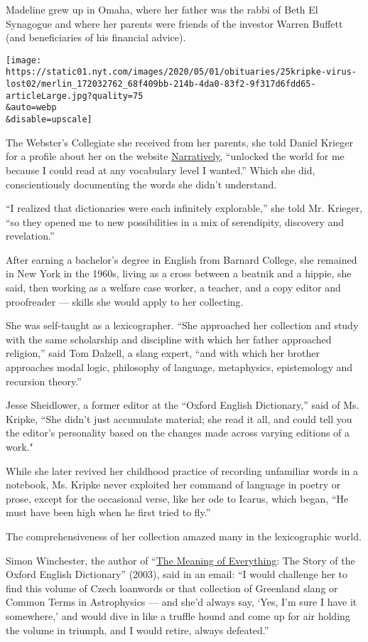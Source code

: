 Madeline grew up in Omaha, where her father was the rabbi of Beth El
Synagogue and where her parents were friends of the investor Warren
Buffett (and beneficiaries of his financial advice).

\texttt{[image: https://static01.nyt.com/images/2020/05/01/obituaries/25kripke-virus-lost02/merlin\_172032762\_68f409bb-214b-4da0-83f2-9f317d6fdd65-articleLarge.jpg?quality=75\\\&auto=webp\\\&disable=upscale]}

The Webster's Collegiate she received from her parents, she told Daniel
Krieger for a profile about her on the website
\href{https://narratively.com/the-dame-of-dictionaries/}{Narratively,}
``unlocked the world for me because I could read at any vocabulary level
I wanted.'' Which she did, conscientiously documenting the words she
didn't understand.

``I realized that dictionaries were each infinitely explorable,'' she
told Mr. Krieger, ``so they opened me to new possibilities in a mix of
serendipity, discovery and revelation.''

After earning a bachelor's degree in English from Barnard College, she
remained in New York in the 1960s, living as a cross between a beatnik
and a hippie, she said, then working as a welfare case worker, a
teacher, and a copy editor and proofreader --- skills she would apply to
her collecting.

She was self-taught as a lexicographer. ``She approached her collection
and study with the same scholarship and discipline with which her father
approached religion,'' said Tom Dalzell, a slang expert, ``and with
which her brother approaches modal logic, philosophy of language,
metaphysics, epistemology and recursion theory.''

Jesse Sheidlower, a former editor at the ``Oxford English Dictionary,''
said of Ms. Kripke, ``She didn't just accumulate material; she read it
all, and could tell you the editor's personality based on the changes
made across varying editions of a work."

While she later revived her childhood practice of recording unfamiliar
words in a notebook, Ms. Kripke never exploited her command of language
in poetry or prose, except for the occasional verse, like her ode to
Icarus, which began, ``He must have been high when he first tried to
fly.''

The comprehensiveness of her collection amazed many in the lexicographic
world.

Simon Winchester, the author of
``\href{https://www.nytimes.com/2003/10/12/books/you-could-look-it-up.html}{The
Meaning of Everything}: The Story of the Oxford English Dictionary''
(2003), said in an email: ``I would challenge her to find this volume of
Czech loanwords or that collection of Greenland slang or Common Terms in
Astrophysics --- and she'd always say, `Yes, I'm sure I have it
somewhere,' and would dive in like a truffle hound and come up for air
holding the volume in triumph, and I would retire, always defeated.''

